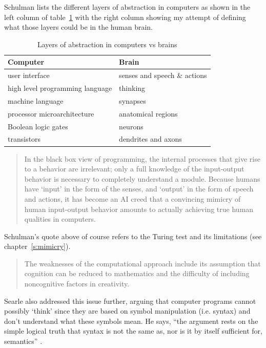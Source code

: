Schulman lists the different layers of abstraction in computers as shown in the left column of table~\ref{tab:abstr} with the right column showing my attempt of defining what those layers could be in the human brain.

\begin{table}[!htbp]
\centering
\caption{Layers of abstraction in computers vs brains}
\label{tab:abstr}
  \begin{tabular}{@{}ll@{}}
  \toprule
  \textbf{Computer}               & \textbf{Brain}      \\ 
  \midrule
  user interface                  & senses and speech \& actions \\
  high level programming language & thinking            \\
  machine language                & synapses            \\
  processor microarchitecture     & anatomical regions  \\
  Boolean logic gates             & neurons             \\
  transistors                     & dendrites and axons \\ 
  \bottomrule
  \end{tabular}
\end{table}

\begin{quotation}
  In the black box view of programming, the internal processes that give rise to a behavior are irrelevant; only a full knowledge of the input-output behavior is necessary to completely understand a module. Because humans have `input' in the form of the senses, and `output' in the form of speech and actions, it has become an AI creed that a convincing mimicry of human input-output behavior amounts to actually achieving true human qualities in computers. \autocite{Schulman2009}
\end{quotation}

Schulman's quote above of course refers to the Turing test and its limitations (see chapter~\ref{s:mimicry}).

\begin{quotation}
  The weaknesses of the computational approach include its assumption that cognition can be reduced to mathematics and the difficulty of including noncognitive factors in creativity. 
\end{quotation}

Searle also addressed this issue further, arguing that computer programs cannot possibly `think' since they are based on symbol manipulation (i.e. syntax) and don't understand what these symbols mean. He says, ``the argument rests on the simple logical truth that syntax is not the same as, nor is it by itself sufficient for, semantics'' \citeyear{Searle1990}.

